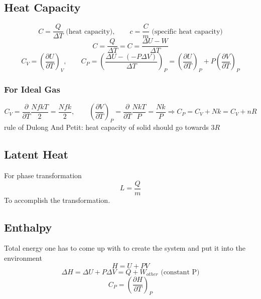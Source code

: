 \documentclass[a4paper,norsk, 10pt]{article}
\begin{document}
\subsection{Heat Capacity}
\begin{equation}
C = \frac{ Q}{\Delta T} \text{ (heat capacity)}, \qquad c = \frac{C}{m} \text{ (specific heat capacity})
\end{equation}
\begin{equation}
C = \frac{ Q}{\Delta T} = C = \frac{\Delta U - W}{\Delta T}
\end{equation}
\begin{equation}
C_V =\left( \frac{\partial U}{\partial T}\right)_V, \qquad C_P = \left(\frac{\Delta U -(-P\Delta V)}{\Delta T}\right)_P = \left( \frac{\partial U}{\partial T}\right)_P + P\left( \frac{\partial V}{\partial T}\right)_P
\end{equation}
\subsubsection{For Ideal Gas}
\begin{equation}
C_V = \frac{\partial}{\partial T }\frac{NfkT}{2} = \frac{Nfk}{2}, \qquad \left(\frac{\partial V}{\partial T}\right)_P = \frac{\partial}{\partial T }\frac{NkT}{P} = \frac{Nk}{P} \Rightarrow C_P = C_V + Nk = C_V + nR
\end{equation}
rule of Dulong And Petit: heat capacity of solid should go towards $3R$

\subsection{Latent Heat}
For phase transformation
\begin{equation}
L = \frac{Q}{m}
\end{equation}
To accomplish the transformation.
\subsection{Enthalpy}
Total energy one has to come up with to create the system and put it into the environment 
\begin{equation}
H = U + PV
\end{equation}
\begin{equation}
\Delta H = \Delta U + P\Delta V = Q +W_{other} \text{ (constant P)}
\end{equation}
\begin{equation}
C_P = \left(\frac{\partial H}{\partial T}\right)_P
\end{equation}
\end{document}
